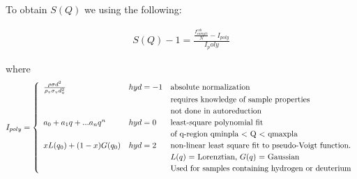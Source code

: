 To obtain $S(Q)$ we using the following:

\begin{equation} \label{eq_nomad_SofQ}
\begin{split}
S(Q) - 1 = \frac{\frac{I_{sample}^{coh}}{N} - I_{poly}}{I_poly}
\end{split}
\end{equation}


where 
\begin{equation*} \label{eq_nomad_Ipoly}
I_{poly} = 
	\renewcommand{\arraystretch}{1.2}
    \left\{\begin{array}{l @{\quad} l l l}

      		\frac{\rho \sigma d^2}{\rho_v \sigma_v d^2_v} & hyd = -1 & \text{absolute normalization} \\ 
      		{}                                            & {}       & \text{requires knowledge of sample properties} \\
      		{}                                            &          & \text{not done in autoreduction} \\
      		a_0 + a_1 q + ... a_nq^n                      & hyd = 0  & \text{least-square polynomial fit} \\
      		{}                                            & {}       & \text{of q-region qminpla $<$ Q $<$ qmaxpla} \\
      		xL(q_0) + (1-x) G(q_0)                        & hyd = 2  & \text{non-linear least square fit to
pseudo-Voigt function.} \\
			{}											  & {}       & \text{$L(q)$ = Lorenztian, $G(q)$ = Gaussian } \\
      		{}                                            & {}       & \text{Used for samples containing hydrogen or deuterium} \\
	\end{array}\right.
\end{equation*}		

 
